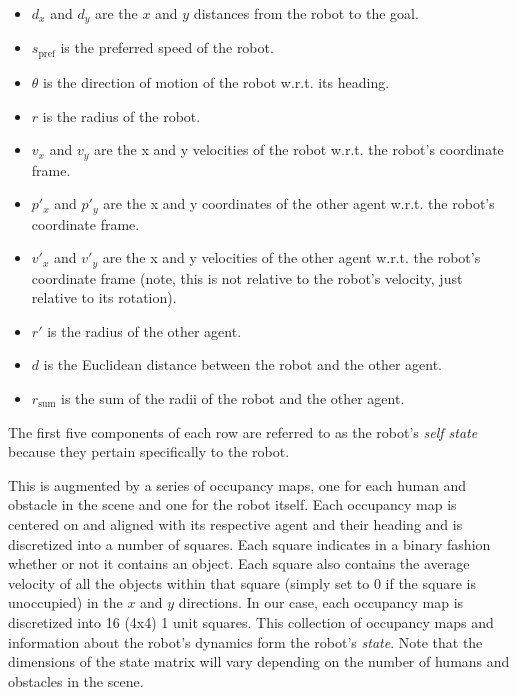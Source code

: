 \documentclass[letterpaper, 10 pt, conference]{ieeeconf}  %
\begin{document}
	\begin{itemize}
		\item $d_x$ and $d_y$ are the $x$ and $y$ distances from the robot to the goal.
		\item $s_\text{pref}$ is the preferred speed of the robot.
		\item $\theta$ is the direction of motion of the robot w.r.t. its heading.
		\item $r$ is the radius of the robot.
		\item $v_x$ and $v_y$ are the x and y velocities of the robot w.r.t. the robot's coordinate frame.
		\item $p'_x$ and $p'_y$ are the x and y coordinates of the other agent w.r.t. the robot's coordinate frame.
		\item $v'_x$ and $v'_y$ are the x and y velocities of the other agent w.r.t. the robot's coordinate frame (note, this is not relative to the robot's velocity, just relative to its rotation).
		\item $r'$ is the radius of the other agent.
		\item $d$ is the Euclidean distance between the robot and the other agent.
		\item $r_\text{sum}$ is the sum of the radii of the robot and the other agent.
	\end{itemize}

	The first five components of each row are referred to as the robot's \textit{self state} because they pertain specifically to the robot.
	
	This is augmented by a series of occupancy maps, one for each human and obstacle in the scene and one for the robot itself. Each occupancy map is centered on and aligned with its respective agent and their heading and is discretized into a number of squares. Each square indicates in a binary fashion whether or not it contains an object. Each square also contains the average velocity of all the objects within that square (simply set to $0$ if the square is unoccupied) in the $x$ and $y$ directions. In our case, each occupancy map is discretized into 16 (4x4) 1 unit squares. This collection of occupancy maps and information about the robot's dynamics form the robot's \textit{state}. Note that the dimensions of the state matrix will vary depending on the number of humans and obstacles in the scene.
	
\end{document}
